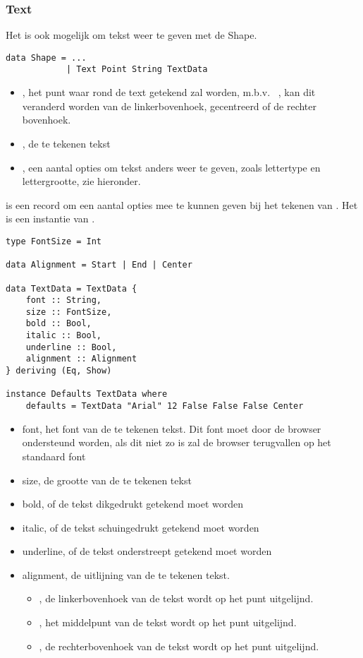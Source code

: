 \subsubsection{Text}
Het is ook mogelijk om tekst weer te geven met de  Shape.
\begin{lstlisting}
data Shape = ...
			| Text Point String TextData
\end{lstlisting} 
\begin{itemize}
	\item {}, het punt waar rond de text getekend zal worden, m.b.v. ~, kan dit veranderd worden van de linkerbovenhoek, gecentreerd of de rechter bovenhoek.
	\item {}, de te tekenen tekst
	\item {}, een aantal opties om tekst anders weer te geven, zoals lettertype en lettergrootte, zie hieronder.
\end{itemize}

 is een record om een aantal opties mee te kunnen geven bij het tekenen van . Het is een instantie van .
\begin{lstlisting}
type FontSize = Int

data Alignment = Start | End | Center

data TextData = TextData {
    font :: String,
    size :: FontSize,
    bold :: Bool,
    italic :: Bool,
    underline :: Bool,
    alignment :: Alignment
} deriving (Eq, Show)

instance Defaults TextData where
    defaults = TextData "Arial" 12 False False False Center
\end{lstlisting}
\begin{itemize}
	\item font, het font van de te tekenen tekst. Dit font moet door de browser ondersteund worden, als dit niet zo is zal de browser terugvallen op het standaard font
	\item size, de grootte van de te tekenen tekst
	\item bold, of de tekst dikgedrukt getekend moet worden
	\item italic, of de tekst schuingedrukt getekend moet worden
	\item underline, of de tekst onderstreept getekend moet worden
	\item alignment, de uitlijning van de te tekenen tekst. 
		\begin{itemize}
			\item {}, de linkerbovenhoek van de tekst wordt op het punt uitgelijnd.
			\item {}, het middelpunt van de tekst wordt op het punt uitgelijnd.
			\item {}, de rechterbovenhoek van de tekst wordt op het punt uitgelijnd.
		\end{itemize}
\end{itemize}

